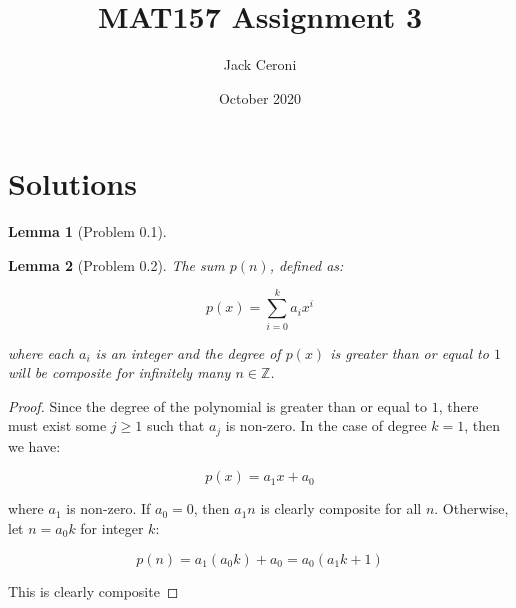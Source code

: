 \documentclass[10pt, oneside]{article}
\title{MAT157 Assignment 3}
\author{Jack Ceroni}
\date{October 2020}
\newtheorem{lem}{Lemma}
\begin{document}
    \maketitle
    \tableofcontents

    \vspace{.25in}

    \newpage

    \section{Solutions}

    \begin{lem}[Problem 0.1]

      \end{lem}

    \begin{lem}[Problem 0.2]
      The sum $p(n)$, defined as:

      $$p(x) = \displaystyle\sum_{i = 0}^{k} a_i x^i$$

      where each $a_i$ is an integer and the degree of $p(x)$ is greater than or equal to $1$ will be
      composite for infinitely many $n \in \mathbb{Z}$.
    \end{lem}

    \begin{proof}
      Since the degree of the polynomial is greater than or equal to $1$, there must exist some $j \geq 1$ such that $a_j$ is non-zero.
      In the case of degree $k = 1$, then we have:

      $$p(x) = a_1 x + a_0$$

      where $a_1$ is non-zero. If $a_0 = 0$, then $a_1 n$ is clearly composite for all $n$. Otherwise, let $n = a_0 k$ for integer $k$:

      $$p(n) = a_1 (a_0 k) + a_0 = a_0 (a_1 k + 1)$$

      This is clearly composite
    \end{proof}

    
\end{document}

